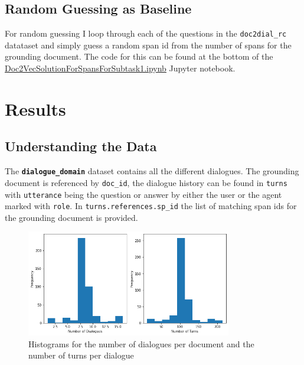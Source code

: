 \documentclass[11pt]{article}
\begin{document}
    \subsection*{Random Guessing as Baseline}\label{subsec:random-guessing-experiment}
    For random guessing I loop through each of the questions in the \texttt{doc2dial\_rc} datataset and simply guess a
    random span id from the number of spans for the grounding document. The code for this can be found at the
    bottom of the \href{https://github.com/isabelladegen/nlp-2021/blob/main/notebooks/Doc2VecSolutionForSpansForSubtask1.ipynb}{Doc2VecSolutionForSpansForSubtask1.ipynb}
    Jupyter notebook. 


    \section{Results}\label{sec:results}

    \subsection{Understanding the Data}\label{subsec:understanding-the-data-results}

    The \textbf{\texttt{dialogue\_domain}} dataset contains all the different dialogues. The grounding document is referenced
    by \texttt{doc\_id}, the dialogue history can be found in \texttt{turns} with \texttt{utterance} being the question
    or answer by either the user or the agent marked with \texttt{role}. In \texttt{turns.references.sp\_id} the list of
    matching span ids for the grounding document is provided.

    \begin{figure}[h]
        \centering
        \includegraphics[width=0.8\textwidth]{number_of_dialogues_and_turns}
        \caption{Histograms for the number of dialogues per document and the number of turns per dialogue}
        \label{fig:histogram-dialogue-and-turns}
    \end{figure}
\end{document}
